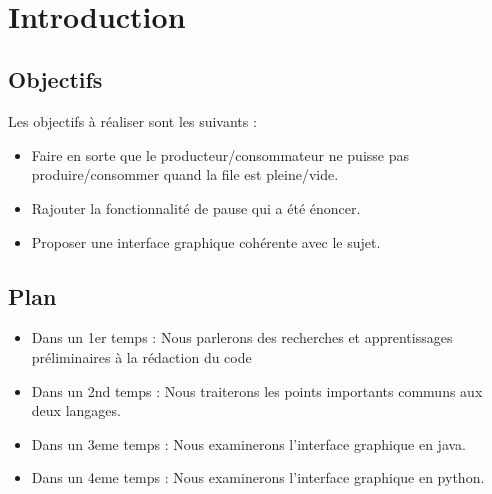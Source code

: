 \documentclass[a4paper]{report}
\begin{document}


\tableofcontents
\thispagestyle{empty}
\setcounter{page}{0}

\newpage
\renewcommand{\arraystretch}{1.5}


~
\thispagestyle{empty}
\setcounter{page}{0}
\newpage



\chapter{Introduction}

\section{Objectifs}

Les objectifs à réaliser sont les suivants :

\begin{itemize} 
\item Faire en sorte que le producteur/consommateur ne puisse pas produire/consommer quand la file est pleine/vide.
\item Rajouter la fonctionnalité de pause qui a été énoncer.
\item Proposer une interface graphique cohérente avec le sujet.
\end{itemize}

\section{Plan}

\begin{itemize}
\item Dans un 1er temps : Nous parlerons des recherches et apprentissages préliminaires à la rédaction du code
\item Dans un 2nd temps : Nous traiterons les points importants communs aux deux langages.
\item Dans un 3eme temps : Nous examinerons l'interface graphique en java.
\item Dans un 4eme temps : Nous examinerons l'interface graphique en python.
\end{itemize}
    
\end{document}
